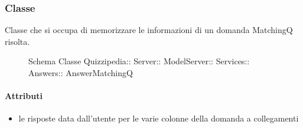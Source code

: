 \subsubsection{Classe }
Classe che si occupa di memorizzare le informazioni di un domanda MatchingQ risolta.
\begin{figure}[H]
\centering
\noindent{}
\caption[Schema Classe AnswerMatchingQ]{Schema Classe Quizzipedia:: Server:: ModelServer:: Services:: Answers:: AnswerMatchingQ}
\end{figure}
\paragraph{Attributi}
\begin{itemize}
\item {}
\newline
le risposte data dall'utente per le varie colonne della domanda a collegamenti
\end{itemize}
